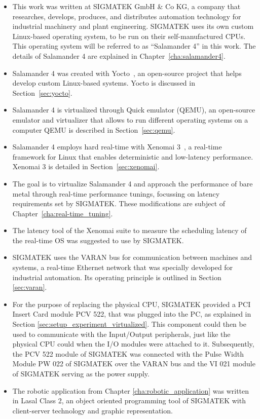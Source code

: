 \documentclass[MMR,Master,english]{twbook}
\begin{document}
\begin{itemize}
	\item This work was written at SIGMATEK GmbH \& Co KG, a company that researches, develops, produces, and distributes automation technology for industrial machinery and plant engineering. SIGMATEK uses its own custom Linux-based operating system, to be run on their self-manufactured CPUs. This operating system will be referred to as ``Salamander 4'' in this work. The details of Salamander 4 are explained in Chapter~\ref{cha:salamander4}.
	\item Salamander 4 was created with Yocto~\cite{WelcomeYoctoProject}, an open-source project that helps develop custom Linux-based systems. Yocto is discussed in Section~\ref{sec:yocto}.
	\item Salamander 4 is virtualized through Quick emulator (QEMU), an open-source emulator and virtualizer that allows to run different operating systems on a computer QEMU is described in Section~\ref{sec:qemu}.
	\item Salamander 4 employs hard real-time with Xenomai 3~\cite{XenomaiXenomai}, a real-time framework for Linux that enables deterministic and low-latency performance. Xenomai 3 is detailed in Section~\ref{sec:xenomai}.
	\item The goal is to virtualize Salamander 4 and approach the performance of bare metal through real-time performance tunings, focussing on latency requirements set by SIGMATEK.
	      These modifications are subject of Chapter~\ref{cha:real-time_tuning}.
	\item The latency tool of the Xenomai suite to measure the scheduling latency of the real-time OS was suggested to use by SIGMATEK.
	\item SIGMATEK uses the VARAN bus for communication between machines and systems, a real-time Ethernet network that was specially developed for industrial automation. Its operating principle is outlined in Section \ref{sec:varan}.
	\item For the purpose of replacing the physical CPU, SIGMATEK provided a PCI Insert Card module PCV 522, that was plugged into the PC, as explained in Section \ref{sec:setup_experiment_virtualized}. This component could then be used to communicate with the Input/Output peripherals, just like the physical CPU could when the I/O modules were attached to it. Subsequently, the PCV 522 module of SIGMATEK was connected with the Pulse Width Module PW 022 of SIGMATEK over the VARAN bus and the VI 021 module of SIGMATEK serving as the power supply.
	\item The robotic application from Chapter \ref{cha:robotic_application} was written in Lasal Class 2, an object oriented programming tool of SIGMATEK with client-server technology and graphic representation.
\end{itemize}
\end{document}
